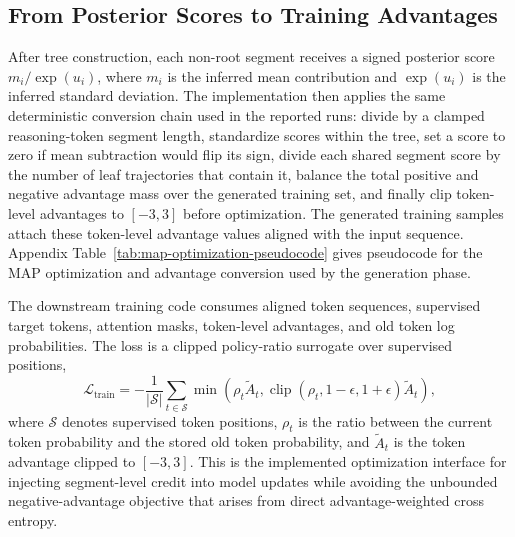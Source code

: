 \documentclass{article}
\begin{document}
\subsection{From Posterior Scores to Training Advantages}
After tree construction, each non-root segment receives a signed posterior score $m_i / \exp(u_i)$, where $m_i$ is the inferred mean contribution and $\exp(u_i)$ is the inferred standard deviation. The implementation then applies the same deterministic conversion chain used in the reported runs: divide by a clamped reasoning-token segment length, standardize scores within the tree, set a score to zero if mean subtraction would flip its sign, divide each shared segment score by the number of leaf trajectories that contain it, balance the total positive and negative advantage mass over the generated training set, and finally clip token-level advantages to $[-3,3]$ before optimization. The generated training samples attach these token-level advantage values aligned with the input sequence.
Appendix Table~\ref{tab:map-optimization-pseudocode} gives pseudocode for the MAP optimization and advantage conversion used by the generation phase.

The downstream training code consumes aligned token sequences, supervised target tokens, attention masks, token-level advantages, and old token log probabilities. The loss is a clipped policy-ratio surrogate over supervised positions,
\begin{equation}
\mathcal{L}_{\text{train}} = -\frac{1}{|\mathcal{S}|}
\sum_{t \in \mathcal{S}}
\min\left(
\rho_t \tilde{A}_t,
\operatorname{clip}(\rho_t,1-\epsilon,1+\epsilon)\tilde{A}_t
\right),
\end{equation}
where $\mathcal{S}$ denotes supervised token positions, $\rho_t$ is the ratio between the current token probability and the stored old token probability, and $\tilde{A}_t$ is the token advantage clipped to $[-3,3]$. This is the implemented optimization interface for injecting segment-level credit into model updates while avoiding the unbounded negative-advantage objective that arises from direct advantage-weighted cross entropy.
\end{document}
